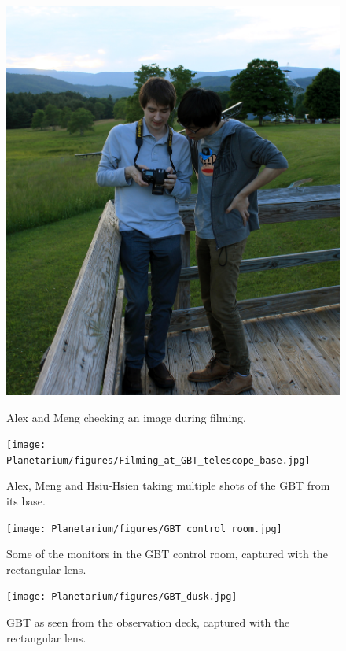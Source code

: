 \begin{figure}[htb]
\centering
\begin{minipage}[b]{0.39\textwidth}
\centering
\includegraphics[width=0.95\linewidth]{Planetarium/figures/Filming_at_GBT_obs_deck.jpg}
\caption{Alex and Meng checking an image during filming.}
\label{Fig:GBT_obs_deck_film}
\end{minipage}%
\begin{minipage}[b]{0.02\textwidth}
\hspace{1cm}
\end{minipage}%
\begin{minipage}[b]{0.55\textwidth}
\centering
\texttt{[image: Planetarium/figures/Filming\_at\_GBT\_telescope\_base.jpg]}
\caption{Alex, Meng and Hsiu-Hsien taking multiple shots of the GBT from its base.}
\label{Fig:GBT_base_film}
\end{minipage}
\end{figure}

\begin{figure}[htb]
\centering
\begin{minipage}[b]{0.53\textwidth}
\centering
\texttt{[image: Planetarium/figures/GBT\_control\_room.jpg]}
\caption{Some of the monitors in the GBT control room, captured with the rectangular lens. }
\label{Fig:GBT_control}
\end{minipage}%
\begin{minipage}[b]{0.02\textwidth}
\hspace{1cm}
\end{minipage}%
\begin{minipage}[b]{0.43\textwidth}
\centering
\texttt{[image: Planetarium/figures/GBT\_dusk.jpg]}
\caption{GBT as seen from the observation deck, captured with the rectangular lens.}
\label{Fig:GBT_dusk}
\end{minipage}
\end{figure}

